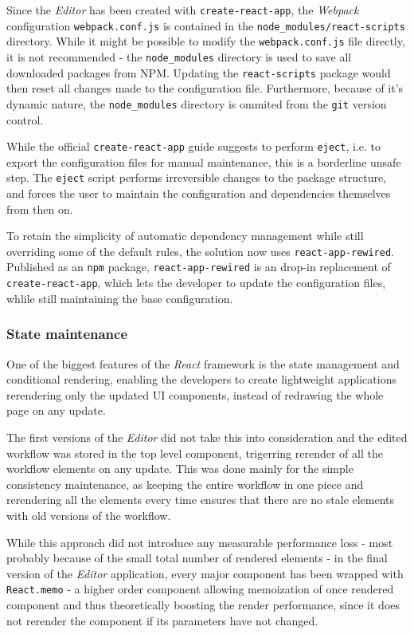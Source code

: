 Since the \textit{Editor} has been created with \texttt{create-react-app}, the \textit{Webpack} configuration \texttt{webpack.conf.js} is contained in the \verb|node_modules/react-scripts| directory.
While it might be possible to modify the \texttt{webpack.conf.js} file directly, it is not recommended - the \verb|node_modules| directory is used to save all downloaded packages from NPM.
Updating the \texttt{react-scripts} package would then reset all changes made to the configuration file.
Furthermore, because of it's dynamic nature, the \verb|node_modules| directory is ommited from the \texttt{git} version control.

While the official \texttt{create-react-app} guide suggests to perform \texttt{eject}, i.e. to export the configuration files for manual maintenance, this is a borderline unsafe step. 
The \texttt{eject} script performs irreversible changes to the package structure, and forces the user to maintain the configuration and dependencies themselves from then on.

To retain the simplicity of automatic dependency management while still overriding some of the default rules, the solution now uses \texttt{react-app-rewired}.
Published as an \texttt{npm} package, \texttt{react-app-rewired} is an drop-in replacement of \texttt{create-react-app}, which lets the developer to update the configuration files, whlile still maintaining the base configuration.

\subsubsection{State maintenance}
One of the biggest features of the \textit{React} framework is the state management and conditional rendering, enabling the developers to create lightweight applications rerendering only the updated \acs{UI} components, instead of redrawing the whole page on any update.

The first versions of the \textit{Editor} did not take this into consideration and the edited workflow was stored in the top level component, trigerring rerender of all the workflow elements on any update. 
This was done mainly for the simple consistency maintenance, as keeping the entire workflow in one piece and rerendering all the elements every time ensures that there are no stale elements with old versions of the workflow.

While this approach did not introduce any measurable performance loss - most probably because of the small total number of rendered elements - in the final version of the \textit{Editor} application, 
every major component has been wrapped with \texttt{React.memo} - a higher order component allowing memoization of once rendered component and thus theoretically boosting the render performance, since it does not rerender the component if its parameters have not changed.

